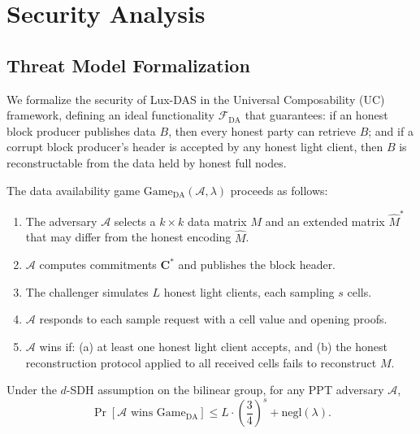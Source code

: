 \section{Security Analysis}

\label{sec:security}

\subsection{Threat Model Formalization}

We formalize the security of Lux-DAS in the Universal Composability (UC) framework,
defining an ideal functionality $\mathcal{F}_{\text{DA}}$ that guarantees: if an honest
block producer publishes data $B$, then every honest party can retrieve $B$; and if a
corrupt block producer's header is accepted by any honest light client, then $B$ is
reconstructable from the data held by honest full nodes.

\begin{definition}
\label{def:da-game}
The data availability game $\text{Game}_{\text{DA}}(\mathcal{A}, \lambda)$ proceeds as follows:
\begin{enumerate}
    \item The adversary $\mathcal{A}$ selects a $k \times k$ data matrix $M$ and an extended
          matrix $\hat{M}^*$ that may differ from the honest encoding $\hat{M}$.
    \item $\mathcal{A}$ computes commitments $\mathbf{C}^*$ and publishes the block header.
    \item The challenger simulates $L$ honest light clients, each sampling $s$ cells.
    \item $\mathcal{A}$ responds to each sample request with a cell value and opening proofs.
    \item $\mathcal{A}$ wins if: (a) at least one honest light client accepts, and
          (b) the honest reconstruction protocol applied to all received cells fails to
          reconstruct $M$.
\end{enumerate}
\end{definition}

\begin{theorem}
\label{thm:main-security}
Under the $d$-SDH assumption on the bilinear group, for any PPT adversary $\mathcal{A}$,
\[
    \Pr[\mathcal{A} \text{ wins } \text{Game}_{\text{DA}}] \leq L \cdot \left(\frac{3}{4}\right)^s + \text{negl}(\lambda).
\]
\end{theorem}

